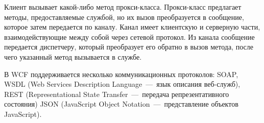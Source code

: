 Клиент вызывает какой-либо метод прокси-класса.
Прокси-класс предлагает методы, предоставляемые службой,
но их вызов преобразуется в сообщение, которое затем передается по каналу. 
Канал имеет клиентскую и серверную части, 
взаимодействующие между собой через сетевой протокол. 
Из канала сообщение передается диспетчеру, 
который преобразует его обратно в вызов метода,
после чего указанный метод вызывается в службе.

В WCF поддерживается несколько коммуникационных протоколов:
SOAP, WSDL (Web Services Description Language~---~язык описания веб-служб),
REST (Representational State Transfer~---~передача репрезентативного состояния)
JSON (JavaScript Object Notation~---~представление объектов JavaScript).